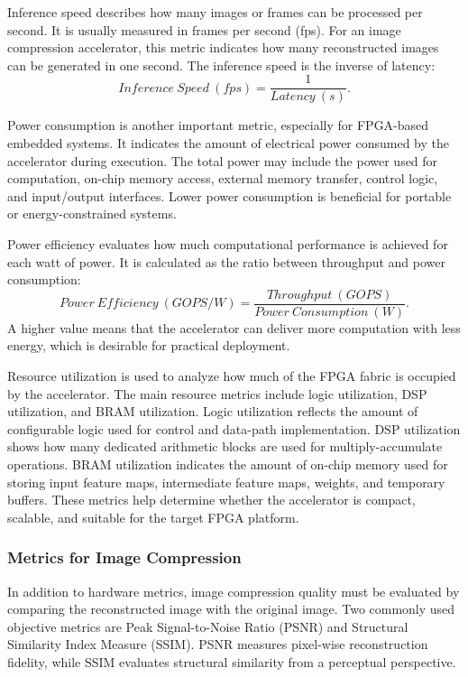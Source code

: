 Inference speed describes how many images or frames can be processed per second. It is usually measured in frames per second (fps). For an image compression accelerator, this metric indicates how many reconstructed images can be generated in one second. The inference speed is the inverse of latency:
\begin{equation}
Inference~Speed~(fps) = \frac{1}{Latency~(s)}.
\end{equation}

Power consumption is another important metric, especially for FPGA-based embedded systems. It indicates the amount of electrical power consumed by the accelerator during execution. The total power may include the power used for computation, on-chip memory access, external memory transfer, control logic, and input/output interfaces. Lower power consumption is beneficial for portable or energy-constrained systems.

Power efficiency evaluates how much computational performance is achieved for each watt of power. It is calculated as the ratio between throughput and power consumption:
\begin{equation}
Power~Efficiency~(GOPS/W) = \frac{Throughput~(GOPS)}{Power~Consumption~(W)}.
\end{equation}
A higher value means that the accelerator can deliver more computation with less energy, which is desirable for practical deployment.

Resource utilization is used to analyze how much of the FPGA fabric is occupied by the accelerator. The main resource metrics include logic utilization, DSP utilization, and BRAM utilization. Logic utilization reflects the amount of configurable logic used for control and data-path implementation. DSP utilization shows how many dedicated arithmetic blocks are used for multiply-accumulate operations. BRAM utilization indicates the amount of on-chip memory used for storing input feature maps, intermediate feature maps, weights, and temporary buffers. These metrics help determine whether the accelerator is compact, scalable, and suitable for the target FPGA platform.

\subsubsection{Metrics for Image Compression}

In addition to hardware metrics, image compression quality must be evaluated by comparing the reconstructed image with the original image. Two commonly used objective metrics are Peak Signal-to-Noise Ratio (PSNR) and Structural Similarity Index Measure (SSIM). PSNR measures pixel-wise reconstruction fidelity, while SSIM evaluates structural similarity from a perceptual perspective. \cite{huynh2008scope,wang2004ssim}

